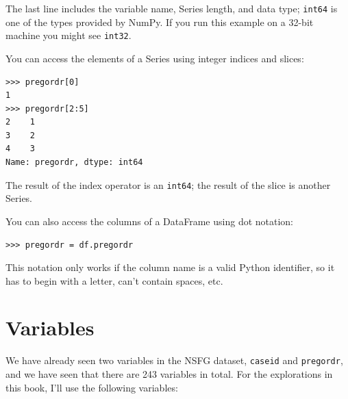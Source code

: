 \documentclass[12pt]{book}
\begin{document}
The last line includes the variable name, Series length, and data type;
{\tt int64} is one of the types provided by NumPy.  If you run
this example on a 32-bit machine you might see {\tt int32}.

You can access the elements of a Series using integer indices
and slices:

\begin{verbatim}
>>> pregordr[0]
1
>>> pregordr[2:5]
2    1
3    2
4    3
Name: pregordr, dtype: int64
\end{verbatim}

The result of the index operator is an {\tt int64}; the
result of the slice is another Series.

You can also access the columns of a DataFrame using dot notation:

\begin{verbatim}
>>> pregordr = df.pregordr
\end{verbatim}

This notation only works if the column name is a valid Python
identifier, so it has to begin with a letter, can't contain spaces, etc.


\section{Variables}

We have already seen two variables in the NSFG dataset, {\tt caseid}
and {\tt pregordr}, and we have seen that there are 243 variables in
total.  For the explorations in this book, I'll use the following
variables:
\end{document}
